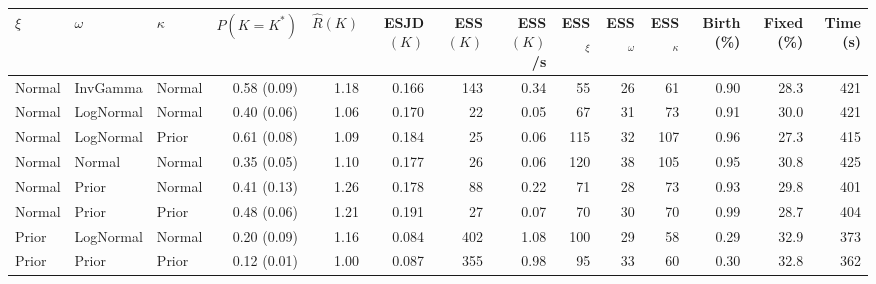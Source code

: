 
\begin{tabular}{l l l r r r r r r r r r r r}
  \toprule
  $\xi$ & $\omega$ & $\kappa$ & $P(K{=}K^*)$ & $\hat{R}(K)$ & ESJD$(K)$ & ESS$(K)$ & ESS$(K)$/s & ESS$_\xi$ & ESS$_\omega$ & ESS$_\kappa$ & Birth (\%) & Fixed (\%) & Time (s) \\
  \midrule
  Normal & InvGamma & Normal & 0.58 (0.09) & 1.18 & 0.166 & 143 & 0.34 & 55 & 26 & 61 & 0.90 & 28.3 & 421 \\
  Normal & LogNormal & Normal & 0.40 (0.06) & 1.06 & 0.170 & 22 & 0.05 & 67 & 31 & 73 & 0.91 & 30.0 & 421 \\
  Normal & LogNormal & Prior & 0.61 (0.08) & 1.09 & 0.184 & 25 & 0.06 & 115 & 32 & 107 & 0.96 & 27.3 & 415 \\
  Normal & Normal & Normal & 0.35 (0.05) & 1.10 & 0.177 & 26 & 0.06 & 120 & 38 & 105 & 0.95 & 30.8 & 425 \\
  Normal & Prior & Normal & 0.41 (0.13) & 1.26 & 0.178 & 88 & 0.22 & 71 & 28 & 73 & 0.93 & 29.8 & 401 \\
  Normal & Prior & Prior & 0.48 (0.06) & 1.21 & 0.191 & 27 & 0.07 & 70 & 30 & 70 & 0.99 & 28.7 & 404 \\
  Prior & LogNormal & Normal & 0.20 (0.09) & 1.16 & 0.084 & 402 & 1.08 & 100 & 29 & 58 & 0.29 & 32.9 & 373 \\
  Prior & Prior & Prior & 0.12 (0.01) & 1.00 & 0.087 & 355 & 0.98 & 95 & 33 & 60 & 0.30 & 32.8 & 362 \\
  \bottomrule
\end{tabular}
